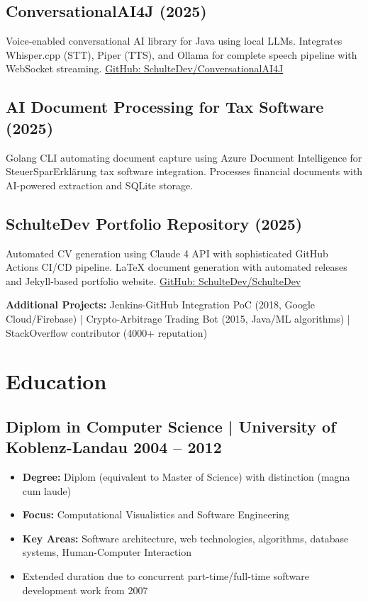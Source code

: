 \documentclass[10pt,a4paper]{article}
\begin{document}
\subsection*{ConversationalAI4J (2025)}
Voice-enabled conversational AI library for Java using local LLMs. Integrates Whisper.cpp (STT), Piper (TTS), and Ollama for complete speech pipeline with WebSocket streaming. \href{https://github.com/SchulteDev/ConversationalAI4J}{GitHub: SchulteDev/ConversationalAI4J}

\subsection*{AI Document Processing for Tax Software (2025)}
Golang CLI automating document capture using Azure Document Intelligence for SteuerSparErklärung tax software integration. Processes financial documents with AI-powered extraction and SQLite storage.

\subsection*{SchulteDev Portfolio Repository (2025)}
Automated CV generation using Claude 4 API with sophisticated GitHub Actions CI/CD pipeline. LaTeX document generation with automated releases and Jekyll-based portfolio website. \href{https://github.com/SchulteDev/SchulteDev}{GitHub: SchulteDev/SchulteDev}

\textbf{Additional Projects:} Jenkins-GitHub Integration PoC (2018, Google Cloud/Firebase) | Crypto-Arbitrage Trading Bot (2015, Java/ML algorithms) | StackOverflow contributor (4000+ reputation)

\newpage

\section*{Education}

\subsection*{Diplom in Computer Science | University of Koblenz-Landau \hfill 2004 -- 2012}
\begin{itemize}[leftmargin=*]
\item \textbf{Degree:} Diplom (equivalent to Master of Science) with distinction (magna cum laude)
\item \textbf{Focus:} Computational Visualistics and Software Engineering
\item \textbf{Key Areas:} Software architecture, web technologies, algorithms, database systems, Human-Computer Interaction
\item Extended duration due to concurrent part-time/full-time software development work from 2007
\end{itemize}
\end{document}
